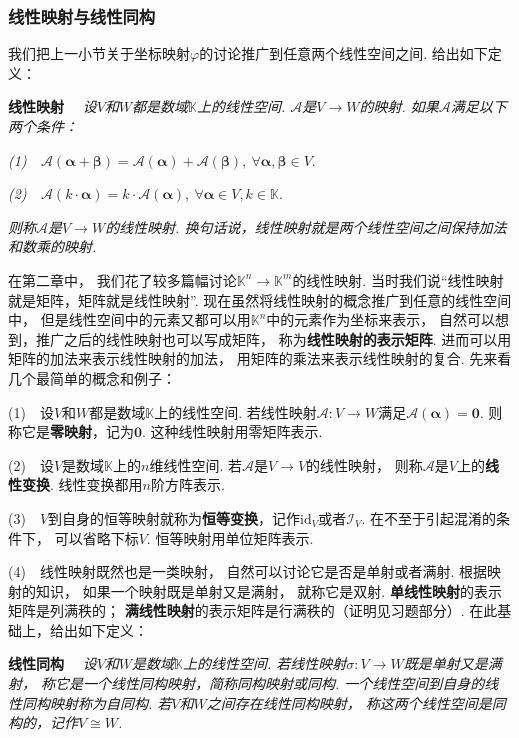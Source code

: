 \subsubsection{线性映射与线性同构}

我们把上一小节关于坐标映射$\varphi$的讨论推广到任意两个线性空间之间.
给出如下定义：\medskip

\textbf{线性映射}~~
\textit{设$V$和$W$都是数域$\mathbb{K}$上的线性空间.
$\mathcal{A}$是$V \to W$的映射.
如果$\mathcal{A}$满足以下两个条件：}

\textit{(1)~~$\mathcal{A} (\bm{\alpha}+\bm{\beta}) = \mathcal{A} (\bm{\alpha}) + \mathcal{A} (\bm{\beta}) , ~\forall \bm{\alpha}, \bm{\beta} \in V$}.

\textit{(2)~~$\mathcal{A} ( k \cdot \bm{\alpha}) = k \cdot \mathcal{A} (\bm{\alpha}), ~\forall \bm{\alpha} \in V , k \in \mathbb{K}$}.

\textit{则称$\mathcal{A}$是$V \to W$的线性映射.
换句话说，线性映射就是两个线性空间之间保持加法和数乘的映射.} \medskip

在第二章中，
我们花了较多篇幅讨论$\mathbb{K}^n \to \mathbb{K}^m$的线性映射.
当时我们说“线性映射就是矩阵，矩阵就是线性映射”.
现在虽然将线性映射的概念推广到任意的线性空间中，
但是线性空间中的元素又都可以用$\mathbb{K}^n$中的元素作为坐标来表示，
自然可以想到，推广之后的线性映射也可以写成矩阵，
称为\textbf{线性映射的表示矩阵}.
进而可以用矩阵的加法来表示线性映射的加法，
用矩阵的乘法来表示线性映射的复合.
先来看几个最简单的概念和例子：\medskip

(1)~~设$V$和$W$都是数域$\mathbb{K}$上的线性空间.
若线性映射$\mathcal{A}: V \to W$满足$\mathcal{A} (\bm{\alpha}) = \bm{0}$.
则称它是\textbf{零映射}，记为$\bm{0}$.
这种线性映射用零矩阵表示.

(2)~~设$V$是数域$\mathbb{K}$上的$n$维线性空间.
若$\mathcal{A}$是$V \to V$的线性映射，
则称$\mathcal{A}$是$V$上的\textbf{线性变换}.
线性变换都用$n$阶方阵表示.

(3)~~$V$到自身的恒等映射就称为\textbf{恒等变换}，记作$\text{id}_V$或者$\mathcal{I}_V$.
在不至于引起混淆的条件下，
可以省略下标$V$.
恒等映射用单位矩阵表示.

(4)~~线性映射既然也是一类映射，
自然可以讨论它是否是单射或者满射.
根据映射的知识，
如果一个映射既是单射又是满射，
就称它是双射.
\textbf{单线性映射}的表示矩阵是列满秩的；
\textbf{满线性映射}的表示矩阵是行满秩的（证明见习题部分）.
在此基础上，给出如下定义：\medskip

\textbf{线性同构}~~
\textit{设$V$和$W$是数域$\mathbb{K}$上的线性空间.
若线性映射$\sigma : V \to W$既是单射又是满射，
称它是一个线性同构映射，简称同构映射或同构.
一个线性空间到自身的线性同构映射称为自同构.
若$V$和$W$之间存在线性同构映射，
称这两个线性空间是同构的，记作$V \cong W$.}\medskip

